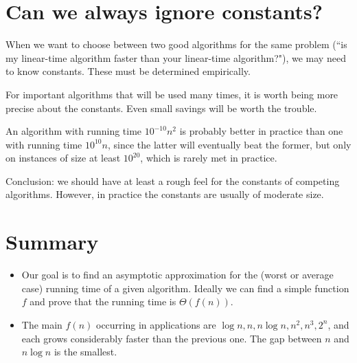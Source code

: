 \section{Can we always ignore constants?}

When we want to choose between two good algorithms for the same
problem (``is my linear-time algorithm faster than your linear-time
algorithm?"), we may need to know constants. These must be determined
empirically. 

For important algorithms that will be used many times, it is worth
being more precise about the constants. Even small savings will be worth
the trouble. 

An algorithm with running time $10^{-10} n^2$ is probably better
in practice than one with running time $10^{10} n$, since the latter
will eventually beat the former, but only on instances of size at least $10^{20}$, 
which is rarely met in practice. 

Conclusion: we should have at least a rough feel for the constants
of competing algorithms. However, in practice the constants are usually
of moderate size. 



\section{Summary}
\begin{itemize}
\item Our goal is to find an asymptotic approximation for the (worst or average 
case) running time of a given algorithm. Ideally we can find a simple function 
$f$ and prove that the running time is $\Theta(f(n))$.
\item The main $f(n)$ occurring in applications are $\log n, n, n \log n, n^2, n^3, 2^n$, and 
each grows considerably faster than the previous one. The gap between $n$ and 
$n\log n$ is the smallest.
\end{itemize}